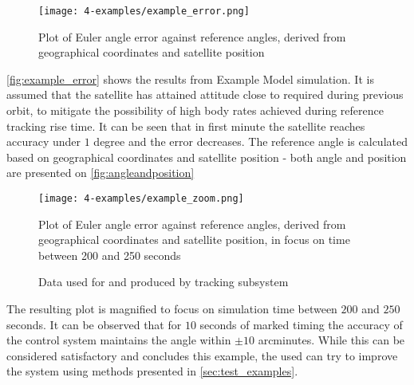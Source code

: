             \begin{figure}[H]
                \centering
                \texttt{[image: 4-examples/example\_error.png]}
                \caption{Plot of Euler angle error against reference angles, derived from geographical coordinates and satellite position}
                \label{fig:example_error}
            \end{figure}

            \autoref{fig:example_error} shows the results from Example Model simulation. It is assumed that the satellite has attained attitude close to required during previous orbit, to mitigate the possibility of high body rates achieved during reference tracking rise time. It can be seen that in first minute the satellite reaches accuracy under $1$ degree and the error decreases. The reference angle is calculated based on geographical coordinates and satellite position - both angle and position are presented on \autoref{fig:angleandposition}
                         
            \begin{figure}[H]
                \centering
                \texttt{[image: 4-examples/example\_zoom.png]}
                \caption{Plot of Euler angle error against reference angles, derived from geographical coordinates and satellite position, in focus on time between 200 and 250 seconds}
                \label{fig:example_zoom}
            \end{figure}

        
            \begin{figure}[H]
                \centering
                \qquad
                \caption{Data used for and produced by tracking subsystem}%
                \label{fig:angleandposition}%
            \end{figure}

            The resulting plot is magnified to focus on simulation time between $200$ and $250$ seconds. It can be observed that for $10$ seconds of marked timing the accuracy of the control system maintains the angle within $\pm 10$ arcminutes. While this can be considered satisfactory and concludes this example, the used can try to improve the system using methods presented in \autoref{sec:test_examples}.
 
